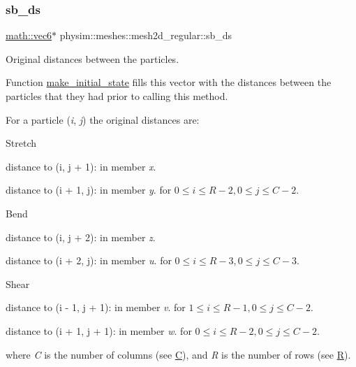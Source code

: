 \subsubsection{\texorpdfstring{sb\+\_\+ds}{sb\_ds}}
{\footnotesize\ttfamily \hyperlink{structphysim_1_1math_1_1vec6}{math\+::vec6}$\ast$ physim\+::meshes\+::mesh2d\+\_\+regular\+::sb\+\_\+ds\hspace{0.3cm}{\ttfamily [private]}}



Original distances between the particles. 

Function \hyperlink{classphysim_1_1meshes_1_1mesh2d__regular_ab05d404566850dd5a2d11814c3c25186}{make\+\_\+initial\+\_\+state} fills this vector with the distances between the particles that they had prior to calling this method.

For a particle ({\itshape i}, {\itshape j}) the original distances are\+:
\begin{DoxyItemize}
\item Stretch
\begin{DoxyItemize}
\item distance to (i, j + 1)\+: in member {\itshape x}.
\item distance to (i + 1, j)\+: in member {\itshape y}. for $0 \le i \le R - 2, 0 \le j \le C - 2$.
\end{DoxyItemize}
\item Bend
\begin{DoxyItemize}
\item distance to (i, j + 2)\+: in member {\itshape z}.
\item distance to (i + 2, j)\+: in member {\itshape u}. for $0 \le i \le R - 3, 0 \le j \le C - 3$.
\end{DoxyItemize}
\item Shear
\begin{DoxyItemize}
\item distance to (i -\/ 1, j + 1)\+: in member {\itshape v}. for $1 \le i \le R - 1, 0 \le j \le C - 2$.
\item distance to (i + 1, j + 1)\+: in member {\itshape w}. for $0 \le i \le R - 2, 0 \le j \le C - 2$.
\end{DoxyItemize}
\end{DoxyItemize}

where {\itshape C} is the number of columns (see \hyperlink{classphysim_1_1meshes_1_1mesh2d__regular_ae26a7e636588726103a835faf67b7771}{C}), and {\itshape R} is the number of rows (see \hyperlink{classphysim_1_1meshes_1_1mesh2d__regular_a5940b5ab5b5b67139d13c10e473b4894}{R}).

